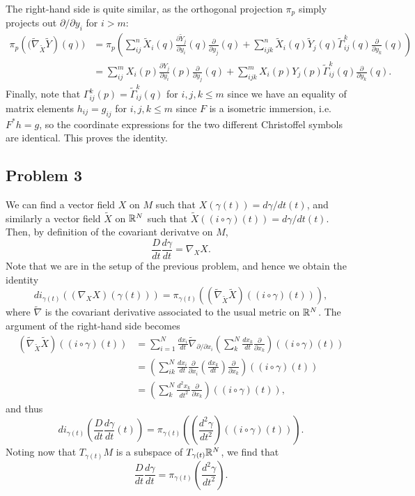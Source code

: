 \documentclass{../mathnotes}
\begin{document}
The right-hand side is quite similar, as the orthogonal projection $\pi_p$ simply projects out $\partial/\partial y_i$ for $i>m$:
\begin{align*}
    \pi_p\left( (\tilde\nabla_{\tilde X}\tilde Y \right)(q)) &= \pi_p\left( \sum_{ij}^n\tilde X_i(q)\frac{\partial \tilde Y_j}{\partial y_i}(q)\frac{\partial}{\partial y_j}(q)
    +\sum_{ijk}^n\tilde X_i(q)\tilde Y_j(q)\tilde\Gamma_{ij}^k(q)\frac{\partial}{\partial y_k}(q)\right)\\
    &= \sum_{ij}^mX_i(p)\frac{\partial Y_j}{\partial y_i}(p)\frac{\partial}{\partial y_j}(q) + \sum_{ijk}^m X_i(p)Y_j(p)\tilde\Gamma_{ij}^k(q)\frac{\partial}{\partial y_k}(q).
\end{align*}
Finally, note that $\Gamma_{ij}^k(p)=\tilde \Gamma_{ij}^k(q)$ for $i,j,k\leq m$ since we have an equality
of matrix elements $h_{ij}=g_{ij}$ for $i,j,k\leq m$ since $F$ is a isometric immersion, i.e. $F^*h=g$, so the
coordinate expressions for the two different Christoffel symbols are identical. This proves the identity.

\subsection*{Problem 3}
We can find a vector field $X$ on $M$ such that $X(\gamma(t))=d\gamma/dt(t)$, and similarly a vector field
$\tilde X$ on $\mathbb{R}^N$ such that $\tilde X( (i\circ\gamma)(t))=d\gamma/dt(t)$. Then, by definition of the covariant
derivatve on $M$,
\[\frac{D}{dt}\frac{d\gamma}{dt} = \nabla_XX.\]
Note that we are in the setup of the previous problem, and hence we obtain the identity
\[di_{\gamma(t)}\left( (\nabla_XX)(\gamma(t)) \right)=\pi_{\gamma(t)}\left( (\tilde\nabla_{\tilde X}\tilde X)((i\circ\gamma)(t)) \right),\]
where $\tilde\nabla$ is the covariant derivative associated to the usual metric on $\mathbb{R}^N$. The argument of the right-hand side becomes
\begin{align*}
    (\tilde\nabla_{\tilde X}\tilde X)((i\circ\gamma)(t)) &= \sum_{i=1}^N\frac{dx_i}{dt}\tilde\nabla_{\partial/\partial x_i}\left( \sum_k^N\frac{dx_k}{dt}\frac{\partial}{\partial x_k} \right)( (i\circ \gamma)(t) )\\
    &= \left( \sum_{ik}^N\frac{dx_i}{dt}\frac{\partial}{\partial x_i}\left(\frac{dx_k}{dt}\right)\frac{\partial}{\partial x_k} \right)( (i\circ \gamma)(t))\\
    &=\left( \sum_k^N\frac{d^2x_k}{dt^2}\frac{\partial}{\partial x_k} \right)( (i\circ\gamma)(t)),
\end{align*}
and thus
\[di_{\gamma(t)}\left( \frac{D}{dt}\frac{d\gamma}{dt}(t) \right)=\pi_{\gamma(t)}\left( \left( \frac{d^2\gamma}{dt^2}\right)( (i\circ\gamma)(t))\right).\]
Noting now that $T_{\gamma(t)}M$ is a subspace of $T_{\gamma(t)}\mathbb{R}^N$, we find that
\[\frac{D}{dt}\frac{d\gamma}{dt} = \pi_{\gamma(t)}\left( \frac{d^2\gamma}{dt^2} \right).\]
\end{document}
